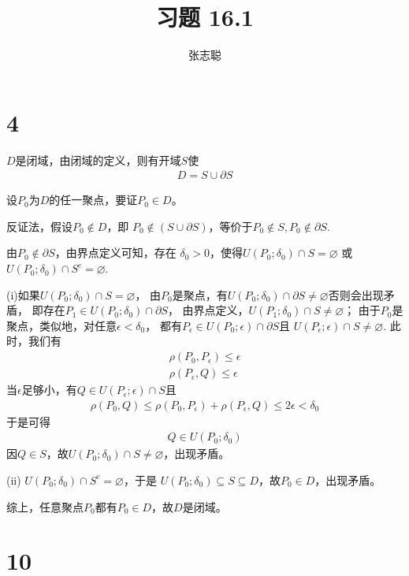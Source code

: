 \documentclass{article}
\begin{document}
\title{习题 16.1}
\author{张志聪}
\maketitle

\section*{4}

$D$是闭域，由闭域的定义，则有开域$S$使
\begin{align*}
  D = S \cup \partial S
\end{align*}

设$P_0$为$D$的任一聚点，要证$P_0 \in D$。

反证法，假设$P_0 \notin D$，即
$P_0 \notin (S \cup \partial S)$，等价于$P_0 \notin S, P_0 \notin \partial S$.

由$P_0 \notin \partial S$，由界点定义可知，存在
$\delta_0 > 0$，使得$U(P_0; \delta_0) \cap S = \varnothing$
或$U(P_0; \delta_0) \cap S^{c} = \varnothing$.

(i)如果$U(P_0; \delta_0) \cap S = \varnothing$，
由$P_0$是聚点，有$U(P_0; \delta_0) \cap \partial S \neq \varnothing$否则会出现矛盾，
即存在$P_1 \in U(P_0; \delta_0) \cap \partial S$，
由界点定义，$U(P_1; \delta_0) \cap S \neq \varnothing$；
由于$P_0$是聚点，类似地，对任意$\epsilon < \delta_0$，
都有$P_{\epsilon} \in U(P_0; \epsilon) \cap \partial S$且
$U(P_{\epsilon}; \epsilon) \cap S \neq \varnothing$.
此时，我们有
\begin{align*}
  \rho(P_0, P_{\epsilon}) \leq \epsilon \\
  \rho(P_{\epsilon}, Q) \leq \epsilon
\end{align*}
当$\epsilon$足够小，有$Q \in U(P_{\epsilon}; \epsilon) \cap S$且
\begin{align*}
  \rho(P_0, Q) \leq \rho(P_0, P_{\epsilon}) + \rho(P_{\epsilon}, Q) \leq 2\epsilon < \delta_0
\end{align*}
于是可得
\begin{align*}
  Q \in U(P_0; \delta_0)
\end{align*}
因$Q \in S$，故$U(P_0; \delta_0) \cap S \neq \varnothing$，出现矛盾。

(ii) $U(P_0; \delta_0) \cap S^{c} = \varnothing$，于是
$U(P_0; \delta_0) \subseteq S \subseteq D$，故$P_0 \in D$，出现矛盾。

综上，任意聚点$P_0$都有$P_0 \in D$，故$D$是闭域。


\section*{10}
\end{document}
